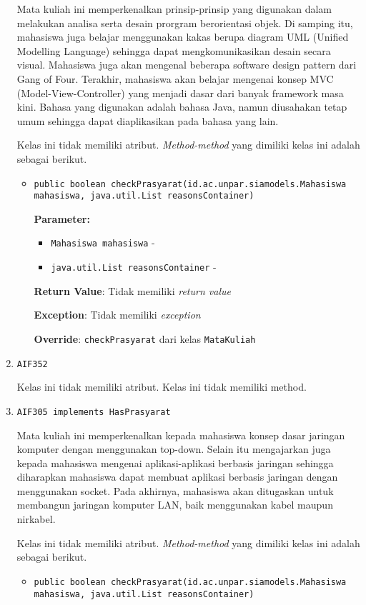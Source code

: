 \documentclass{article}
\begin{document}
\begin{enumerate}
Mata kuliah ini memperkenalkan prinsip-prinsip yang digunakan dalam 
 melakukan analisa serta desain prorgram berorientasi objek. Di samping itu, 
 mahasiswa juga belajar menggunakan kakas berupa diagram UML (Unified 
 Modelling Language) sehingga dapat mengkomunikasikan desain secara visual. 
 Mahasiswa juga akan mengenal beberapa software design pattern dari Gang of 
 Four. Terakhir, mahasiswa akan belajar mengenai konsep MVC 
 (Model-View-Controller) yang menjadi dasar dari banyak framework masa kini.
 Bahasa yang digunakan adalah bahasa Java, namun diusahakan tetap umum 
 sehingga dapat diaplikasikan pada bahasa yang lain.

Kelas ini tidak memiliki atribut. \textit{Method-method} yang dimiliki kelas ini adalah sebagai berikut.
\begin{itemize}
\item \texttt{public boolean checkPrasyarat(id.ac.unpar.siamodels.Mahasiswa mahasiswa, java.util.List reasonsContainer)}

\textbf{Parameter:}
\begin{itemize}
\item \texttt{Mahasiswa mahasiswa} - 
\item \texttt{java.util.List reasonsContainer} - 
\end{itemize}
\textbf{Return Value}: Tidak memiliki \textit{return value}

\textbf{Exception}: Tidak memiliki \textit{exception}

\textbf{Override}: \texttt{checkPrasyarat} dari kelas \texttt{MataKuliah}

\end{itemize}
\item \texttt{AIF352}



Kelas ini tidak memiliki atribut. Kelas ini tidak memiliki method. \item \texttt{AIF305 implements HasPrasyarat}

Mata kuliah ini memperkenalkan kepada mahasiswa konsep dasar jaringan
 komputer dengan menggunakan top-down. Selain itu mengajarkan juga kepada
 mahasiswa mengenai aplikasi-aplikasi berbasis jaringan sehingga diharapkan
 mahasiswa dapat membuat aplikasi berbasis jaringan dengan menggunakan socket.
 Pada akhirnya, mahasiswa akan ditugaskan untuk membangun jaringan komputer
 LAN, baik menggunakan kabel maupun nirkabel.

Kelas ini tidak memiliki atribut. \textit{Method-method} yang dimiliki kelas ini adalah sebagai berikut.
\begin{itemize}
\item \texttt{public boolean checkPrasyarat(id.ac.unpar.siamodels.Mahasiswa mahasiswa, java.util.List reasonsContainer)}


\end{itemize}
\end{enumerate}
\end{document}
